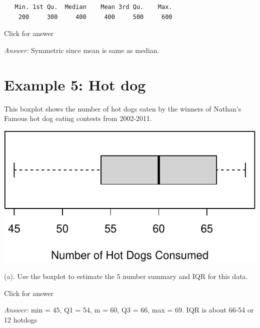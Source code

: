\documentclass[
]{book}
\newenvironment{Shaded}{\begin{snugshade}}{\end{snugshade}}
\newcommand{\AttributeTok}[1]{\textcolor[rgb]{0.77,0.63,0.00}{#1}}
\newcommand{\FunctionTok}[1]{\textcolor[rgb]{0.00,0.00,0.00}{#1}}
\newcommand{\NormalTok}[1]{#1}
\newcommand{\OtherTok}[1]{\textcolor[rgb]{0.56,0.35,0.01}{#1}}
\newcommand{\SpecialCharTok}[1]{\textcolor[rgb]{0.00,0.00,0.00}{#1}}
\newcommand{\StringTok}[1]{\textcolor[rgb]{0.31,0.60,0.02}{#1}}
\begin{document}
\begin{verbatim}
   Min. 1st Qu.  Median    Mean 3rd Qu.    Max. 
    200     300     400     400     500     600 
\end{verbatim}

Click for answer

\emph{Answer:} Symmetric since mean is same as median.

\hypertarget{example-5-hot-dog}{%
\section{Example 5: Hot dog}\label{example-5-hot-dog}}

This boxplot shows the number of hot dogs eaten by the winners of Nathan's Famous hot dog eating contests from 2002-2011.

\begin{Shaded}
\end{Shaded}

\includegraphics[width=1\linewidth]{Class_Activity_5_files/figure-latex/unnamed-chunk-22-1}

(a). Use the boxplot to estimate the 5 number summary and IQR for this data.

Click for answer

\emph{Answer:} min = 45, Q1 = 54, m = 60, Q3 = 66, max = 69. IQR is about 66-54 or 12 hotdogs
\end{document}
